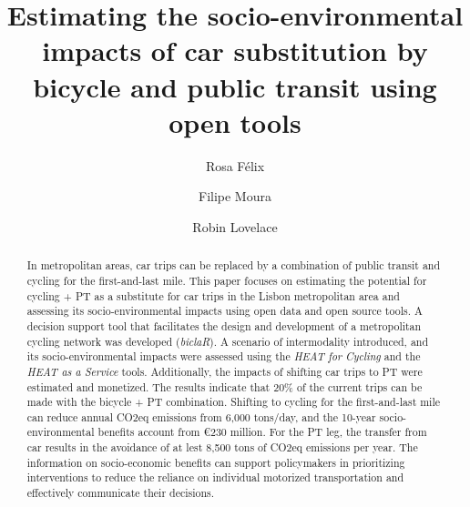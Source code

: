 \documentclass[runningheads]{llncs}
\begin{document}
\title{Estimating the socio-environmental impacts of car substitution by
bicycle and public transit using open tools}
%
%
\author{Rosa Félix \and Filipe
Moura \and Robin
Lovelace}


%


\maketitle              %
%
\begin{abstract}
In metropolitan areas, car trips can be replaced by a combination of
public transit and cycling for the first-and-last mile. This paper
focuses on estimating the potential for cycling + PT as a substitute for
car trips in the Lisbon metropolitan area and assessing its
socio-environmental impacts using open data and open source tools. A
decision support tool that facilitates the design and development of a
metropolitan cycling network was developed (\emph{biclaR}). A scenario
of intermodality introduced, and its socio-environmental impacts were
assessed using the \emph{HEAT for Cycling} and the \emph{HEAT as a
Service} tools. Additionally, the impacts of shifting car trips to PT
were estimated and monetized. The results indicate that 20\% of the
current trips can be made with the bicycle + PT combination. Shifting to
cycling for the first-and-last mile can reduce annual CO2eq emissions
from 6,000 tons/day, and the 10-year socio-environmental benefits
account from €230 million. For the PT leg, the transfer from car results
in the avoidance of at lest 8,500 tons of CO2eq emissions per year. The
information on socio-economic benefits can support policymakers in
prioritizing interventions to reduce the reliance on individual
motorized transportation and effectively communicate their decisions.


\end{abstract}
\end{document}
